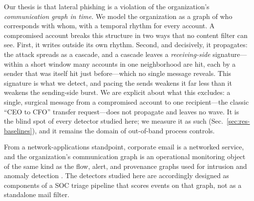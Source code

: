 Our thesis is that lateral phishing is a violation of the organization's \emph{communication graph in time}.
We model the organization as a graph of who corresponds with whom, with a temporal rhythm for every account.
A compromised account breaks this structure in two ways that no content filter can see. First, it writes
outside its own rhythm. Second, and decisively, it propagates: the attack spreads as a cascade, and a cascade
leaves a \emph{receiving-side} signature---within a short window many accounts in one neighborhood are hit,
each by a sender that was itself hit just before---which no single message reveals. This signature is what
we detect, and pacing the sends weakens it far less than it weakens the sending-side burst. We are explicit
about what this excludes: a single, surgical message from a compromised account to one recipient---the
classic ``CEO to CFO'' transfer request---does not propagate and leaves no wave. It is the blind spot of every
detector studied here; we measure it as such (Sec.~\ref{sec:res-baselines}), and it remains the domain of
out-of-band process controls.

From a network-applications standpoint, corporate email is a networked service, and the organization's
communication graph is an operational monitoring object of the same kind as the flow, alert, and provenance
graphs used for intrusion and anomaly detection \citep{nayeri2026alert,weng2024rtapt}. The detectors studied
here are accordingly designed as components of a SOC triage pipeline that scores events on that graph, not as
a standalone mail filter.


